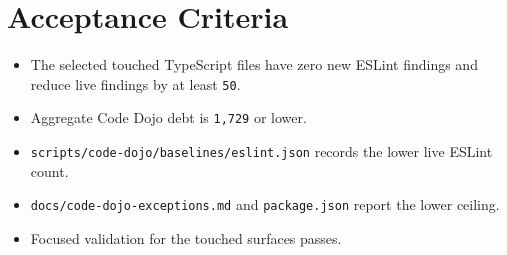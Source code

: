 \section{Acceptance Criteria}\label{record-222-acceptance-criteria}

\begin{itemize}
\tightlist
\item
  The selected touched TypeScript files have zero new ESLint findings and reduce live findings by at least \texttt{5\allowbreak{}0}.
\item
  Aggregate Code Dojo debt is \texttt{1\allowbreak{},\allowbreak{}7\allowbreak{}2\allowbreak{}9} or lower.
\item
  \texttt{s\allowbreak{}c\allowbreak{}r\allowbreak{}i\allowbreak{}p\allowbreak{}t\allowbreak{}s\allowbreak{}/\allowbreak{}c\allowbreak{}o\allowbreak{}d\allowbreak{}e\allowbreak{}-\allowbreak{}d\allowbreak{}o\allowbreak{}j\allowbreak{}o\allowbreak{}/\allowbreak{}b\allowbreak{}a\allowbreak{}s\allowbreak{}e\allowbreak{}l\allowbreak{}i\allowbreak{}n\allowbreak{}e\allowbreak{}s\allowbreak{}/\allowbreak{}e\allowbreak{}s\allowbreak{}l\allowbreak{}i\allowbreak{}n\allowbreak{}t\allowbreak{}.\allowbreak{}j\allowbreak{}s\allowbreak{}o\allowbreak{}n} records the lower live ESLint count.
\item
  \texttt{d\allowbreak{}o\allowbreak{}c\allowbreak{}s\allowbreak{}/\allowbreak{}c\allowbreak{}o\allowbreak{}d\allowbreak{}e\allowbreak{}-\allowbreak{}d\allowbreak{}o\allowbreak{}j\allowbreak{}o\allowbreak{}-\allowbreak{}e\allowbreak{}x\allowbreak{}c\allowbreak{}e\allowbreak{}p\allowbreak{}t\allowbreak{}i\allowbreak{}o\allowbreak{}n\allowbreak{}s\allowbreak{}.\allowbreak{}m\allowbreak{}d} and \texttt{p\allowbreak{}a\allowbreak{}c\allowbreak{}k\allowbreak{}a\allowbreak{}g\allowbreak{}e\allowbreak{}.\allowbreak{}j\allowbreak{}s\allowbreak{}o\allowbreak{}n} report the lower ceiling.
\item
  Focused validation for the touched surfaces passes.
\end{itemize}

